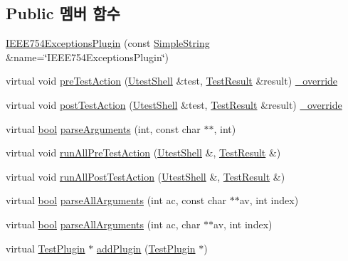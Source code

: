 \subsection*{Public 멤버 함수}
\begin{DoxyCompactItemize}
\item 
\hyperlink{class_i_e_e_e754_exceptions_plugin_ae50a5851c02bfc5b58b2919f88adfc5b}{I\+E\+E\+E754\+Exceptions\+Plugin} (const \hyperlink{class_simple_string}{Simple\+String} \&name=\char`\"{}I\+E\+E\+E754\+Exceptions\+Plugin\char`\"{})
\item 
virtual void \hyperlink{class_i_e_e_e754_exceptions_plugin_af405f9e83b5fbe382893b8dc07a8052c}{pre\+Test\+Action} (\hyperlink{class_utest_shell}{Utest\+Shell} \&test, \hyperlink{class_test_result}{Test\+Result} \&result) \hyperlink{_cpp_u_test_config_8h_a049bea15dd750e15869863c94c1efc3b}{\+\_\+override}
\item 
virtual void \hyperlink{class_i_e_e_e754_exceptions_plugin_a488f8809f966fc52513ee74afa87cda3}{post\+Test\+Action} (\hyperlink{class_utest_shell}{Utest\+Shell} \&test, \hyperlink{class_test_result}{Test\+Result} \&result) \hyperlink{_cpp_u_test_config_8h_a049bea15dd750e15869863c94c1efc3b}{\+\_\+override}
\item 
virtual \hyperlink{avb__gptp_8h_af6a258d8f3ee5206d682d799316314b1}{bool} \hyperlink{class_test_plugin_a167c2b07a0f83726bb9b1d1c0d741f88}{parse\+Arguments} (int, const char $\ast$$\ast$, int)
\item 
virtual void \hyperlink{class_test_plugin_aa3524b10b0f1613104fa75f1c1a72cf6}{run\+All\+Pre\+Test\+Action} (\hyperlink{class_utest_shell}{Utest\+Shell} \&, \hyperlink{class_test_result}{Test\+Result} \&)
\item 
virtual void \hyperlink{class_test_plugin_ac6e93f69beb5b43b8cedf17a77ccc6b1}{run\+All\+Post\+Test\+Action} (\hyperlink{class_utest_shell}{Utest\+Shell} \&, \hyperlink{class_test_result}{Test\+Result} \&)
\item 
virtual \hyperlink{avb__gptp_8h_af6a258d8f3ee5206d682d799316314b1}{bool} \hyperlink{class_test_plugin_acfa2bcea2c98a16cb7d2a8f177bb84b9}{parse\+All\+Arguments} (int ac, const char $\ast$$\ast$av, int index)
\item 
virtual \hyperlink{avb__gptp_8h_af6a258d8f3ee5206d682d799316314b1}{bool} \hyperlink{class_test_plugin_a6d3fb0408bb544bd7ec5ba9300328a5e}{parse\+All\+Arguments} (int ac, char $\ast$$\ast$av, int index)
\item 
virtual \hyperlink{class_test_plugin}{Test\+Plugin} $\ast$ \hyperlink{class_test_plugin_ac63612b566d31b52b9c09e0552f8fe9b}{add\+Plugin} (\hyperlink{class_test_plugin}{Test\+Plugin} $\ast$)
$$
\end{DoxyCompactItemize}
